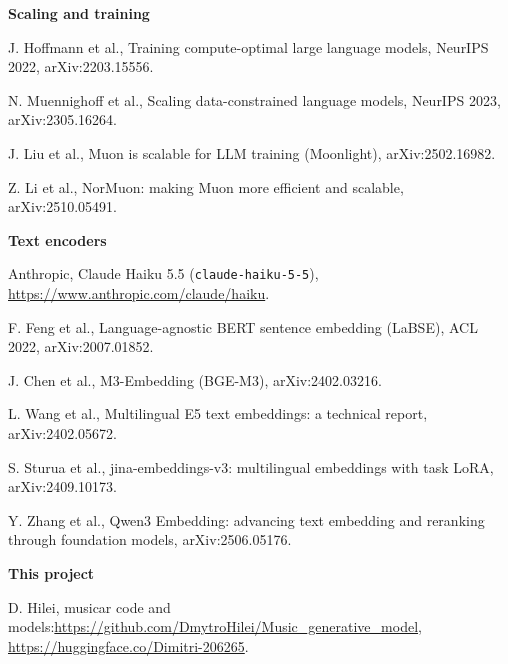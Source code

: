 \documentclass[11pt,a4paper]{article}
\newcounter{refc}
\begin{document}
\textbf{Scaling and training}
\begin{enumerate}[label={[\arabic*]},nosep,leftmargin=2.2em]
\setcounter{enumi}{\value{refc}}
\item J. Hoffmann et al., Training compute-optimal large language models, NeurIPS 2022, arXiv:2203.15556.
\item N. Muennighoff et al., Scaling data-constrained language models, NeurIPS 2023, arXiv:2305.16264.
\item J. Liu et al., Muon is scalable for LLM training (Moonlight), arXiv:2502.16982.
\item Z. Li et al., NorMuon: making Muon more efficient and scalable, arXiv:2510.05491.
\setcounter{refc}{\value{enumi}}
\end{enumerate}

\textbf{Text encoders}
\begin{enumerate}[label={[\arabic*]},nosep,leftmargin=2.2em]
\setcounter{enumi}{\value{refc}}
\item Anthropic, Claude Haiku 5.5 (\texttt{claude-haiku-5-5}), \url{https://www.anthropic.com/claude/haiku}.
\item F. Feng et al., Language-agnostic BERT sentence embedding (LaBSE), ACL 2022, arXiv:2007.01852.
\item J. Chen et al., M3-Embedding (BGE-M3), arXiv:2402.03216.
\item L. Wang et al., Multilingual E5 text embeddings: a technical report, arXiv:2402.05672.
\item S. Sturua et al., jina-embeddings-v3: multilingual embeddings with task LoRA, arXiv:2409.10173.
\item Y. Zhang et al., Qwen3 Embedding: advancing text embedding and reranking through foundation models,
arXiv:2506.05176.
\setcounter{refc}{\value{enumi}}
\end{enumerate}

\textbf{This project}
\begin{enumerate}[label={[\arabic*]},nosep,leftmargin=2.2em]
\setcounter{enumi}{\value{refc}}
\item D. Hilei, musicar code and models:\newline \url{https://github.com/DmytroHilei/Music_generative_model},\newline
\url{https://huggingface.co/Dimitri-206265}.
\end{enumerate}
\end{document}
